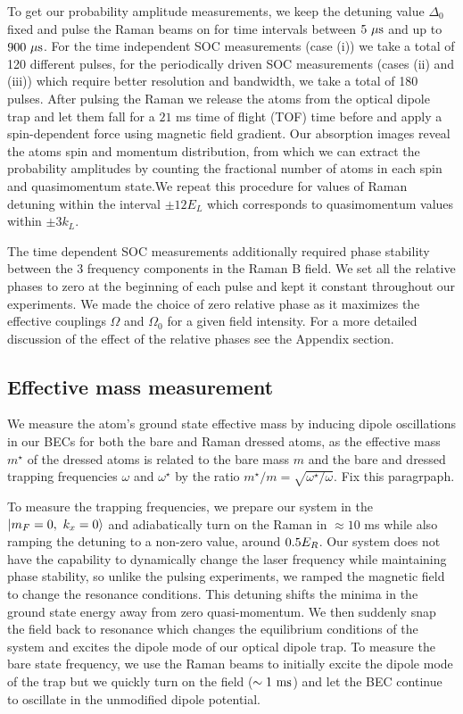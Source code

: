 To get our probability amplitude measurements, we keep the detuning value $\Delta_0$ fixed and pulse the Raman beams on for time intervals between $5{\ \mu{\rm s}}$ and up to $900{\ \mu{\rm s}}$. For the time independent SOC measurements (case (i)) we take a total of 120 different pulses, for the periodically driven SOC measurements (cases (ii) and (iii)) which require better resolution and bandwidth, we take a total of 180 pulses. After pulsing the Raman we release the atoms from the optical dipole trap and let them fall for a $21$ ms time of flight (TOF) time before and apply a spin-dependent force using magnetic field gradient. Our absorption images reveal the atoms spin and momentum distribution, from which we can extract the probability amplitudes by counting the fractional number of atoms in each spin and quasimomentum state.We repeat this procedure for values of Raman detuning within the interval $\pm 12 E_L$ which corresponds to quasimomentum values within $\pm 3k_L$.

The time dependent SOC measurements additionally required phase stability between the 3 frequency components in the Raman B field. We set all the relative phases to zero at the beginning of each pulse and kept it constant throughout our experiments. We made the choice of zero relative phase as it maximizes the effective couplings $\Omega$ and $\Omega_0$ for a given field intensity. For a more detailed discussion of the effect of the relative phases see the Appendix section. 

\subsection{Effective mass measurement}

We measure the atom's ground state effective mass by inducing dipole oscillations in our BECs for both the bare and Raman dressed atoms, as the effective mass $m^{\star}$ of the dressed atoms is related to the bare mass $m$ and the bare and dressed trapping frequencies $\omega$ and $\omega^{\star}$ by the ratio $m^{\star}/m=\sqrt{\omega^{\star}/\omega}$. Fix this paragrpaph. 

 To measure the trapping frequencies, we prepare our system in the  $|m_F=0,\ k_x=0\rangle$ and adiabatically turn on the Raman in $\approx10$ ms while also ramping the detuning to a non-zero value, around $0.5{{E_R}}$. Our system does not have the capability to dynamically change the laser frequency while maintaining phase stability, so unlike the pulsing experiments, we ramped the magnetic field to change the resonance conditions. This detuning shifts the minima in the ground state energy away from zero quasi-momentum. We then suddenly snap the field back to resonance which changes the equilibrium conditions of the system and excites the dipole mode of our optical dipole trap. To measure the bare state frequency, we use the Raman beams to initially excite the dipole mode of the trap but we quickly turn on the field ($\sim1{\ {\rm ms}}$) and let the BEC continue to oscillate in the unmodified dipole potential. 

